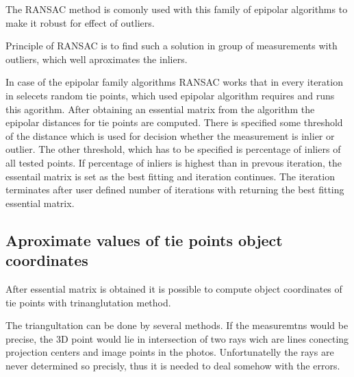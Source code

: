 \documentclass[a4paper,12pt]{report}
\begin{document}
The RANSAC \cite{RANSAC} method is comonly used with this family of epipolar algorithms to 
make it robust for effect of outliers.

Principle of RANSAC is to find such  a solution in group of measurements with outliers, 
which well aproximates the inliers. 

In case of the epipolar family algorithms RANSAC works that in every iteration 
in selecets random tie points, which used epipolar algorithm requires and 
runs this agorithm. After obtaining an essential matrix from the algorithm the epipolar 
distances for tie points are computed. There is specified some threshold of the distance which is used 
for decision whether the measurement is inlier or outlier. The other threshold, which has to be specified 
is percentage of inliers of all tested points. If percentage of inliers is highest than in prevous iteration,
the essentail matrix is set as the best fitting and iteration continues. The iteration terminates after user defined 
number of iterations with returning the best fitting essential matrix.

\subsection{Aproximate values  of tie points object coordinates}

After essential matrix is obtained it is possible to compute object coordinates of tie points with trinanglutation
method.

The triangultation can be done by several methods. If the measuremtns would be precise, the 3D point 
would lie in intersection of two rays wich are lines conecting projection centers and image points 
in the photos. Unfortunatelly the rays are never determined so precisly, thus it is needed to deal 
somehow with the errors. 
\end{document}
